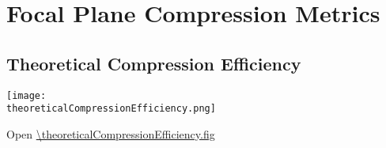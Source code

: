 %
% 
% 
%
%
\section{Focal Plane Compression Metrics}

\subsection{Theoretical Compression Efficiency}

\begin{center}
  \texttt{[image: \\theoreticalCompressionEfficiency.png]}
\end{center}
Open \url{\theoreticalCompressionEfficiency.fig}


